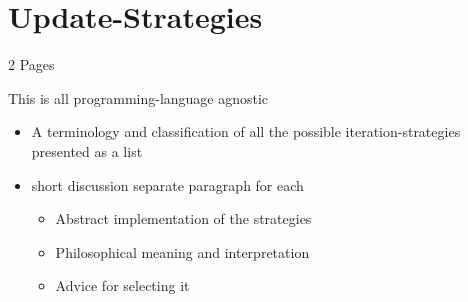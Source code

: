 \section{Update-Strategies}
2 Pages

This is all programming-language agnostic

\begin{itemize}
	\item A terminology and classification of all the possible iteration-strategies presented as a list 
	\item short discussion separate paragraph for each
		\begin{itemize}
			\item Abstract implementation of the strategies
			\item Philosophical meaning and interpretation
			\item Advice for selecting it
		\end{itemize}
\end{itemize} 
